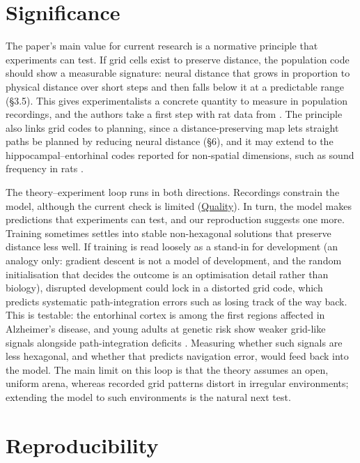 \documentclass[10pt,letterpaper]{article}
\begin{document}
 

\section{Significance} \label{sec:significance}
The paper’s main value for current research is a normative principle that experiments can test. If grid cells exist to preserve distance, the population code should show a measurable signature: neural distance that grows in proportion to physical distance over short steps and then falls below it at a predictable range (§3.5). This gives experimentalists a concrete quantity to measure in population recordings, and the authors take a first step with rat data from \citet{gardner2021toroidal}. The principle also links grid codes to planning, since a distance-preserving map lets straight paths be planned by reducing neural distance (§6), and it may extend to the hippocampal–entorhinal codes reported for non-spatial dimensions, such as sound frequency in rats \citep{aronov2017mapping}.

The theory–experiment loop runs in both directions. Recordings constrain the model, although the current check is limited (\hyperref[sec:quality]{Quality}). In turn, the model makes predictions that experiments can test, and our reproduction suggests one more. Training sometimes settles into stable non-hexagonal solutions that preserve distance less well. If training is read loosely as a stand-in for development (an analogy only: gradient descent is not a model of development, and the random initialisation that decides the outcome is an optimisation detail rather than biology), disrupted development could lock in a distorted grid code, which predicts systematic path-integration errors such as losing track of the way back. This is testable: the entorhinal cortex is among the first regions affected in Alzheimer’s disease, and young adults at genetic risk show weaker grid-like signals alongside path-integration deficits \citep{kunz2015reduced}. Measuring whether such signals are less hexagonal, and whether that predicts navigation error, would feed back into the model. The main limit on this loop is that the theory assumes an open, uniform arena, whereas recorded grid patterns distort in irregular environments; extending the model to such environments is the natural next test.

\section{Reproducibility} \label{sec:repro}
\end{document}
